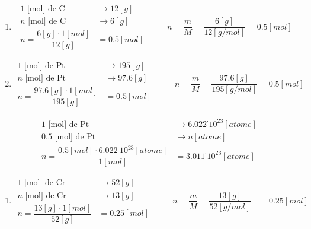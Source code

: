 \documentclass[
  11pt,
  a4paper,
  openany]{book}
\providecommand{\tightlist}{%
  \setlength{\itemsep}{0pt}\setlength{\parskip}{0pt}}
\begin{document}
\begin{Answer}

\begin{enumerate}
\def\labelenumi{\arabic{enumi}.}
\item
  \[ \begin{split}
           1 \text{ [mol] de C } &\longrightarrow 12 [g]\\
           n \text{ [mol] de C } &\longrightarrow 6 [g]\\
           n = \dfrac{6 [g] \cdot 1 [mol]}{12 [g]} &= 0.5 [mol]
       \end{split}
       \qquad
       \begin{split}
       n = \dfrac{m}{M} = \dfrac{6[g]}{12[g/mol]} = 0.5 [mol]
   \end{split} \]
\item
  \[ \begin{split}
           1 \text{ [mol] de Pt } &\longrightarrow 195 [g]\\
           n \text{ [mol] de Pt } &\longrightarrow 97.6 [g]\\
           n = \dfrac{97.6 [g] \cdot 1 [mol]}{195 [g]} &= 0.5 [mol]
       \end{split}
       \qquad
       \begin{split}
       n = \dfrac{m}{M} = \dfrac{97.6[g]}{195[g/mol]} = 0.5 [mol]
   \end{split} \]
\end{enumerate}

\[ \begin{split}
  1 \text{ [mol] de Pt } &\longrightarrow 6.022^\cdot10^{23} [atome]\\
  0.5 \text{ [mol] de Pt } &\longrightarrow n [atome]\\
  n = \dfrac{0.5 [mol] \cdot 6.022^\cdot10^{23} [atome]}{1 [mol]} &= 3.011^\cdot10^{23} [atome]
  \end{split} \]

\begin{enumerate}
\def\labelenumi{\arabic{enumi}.}
\setcounter{enumi}{2}
\tightlist
\item
  \[ \begin{split}
       1 \text{ [mol] de Cr } &\longrightarrow 52 [g]\\
       n \text{ [mol] de Cr } &\longrightarrow 13 [g]\\
       n = \dfrac{13 [g] \cdot 1 [mol]}{52 [g]} &= 0.25 [mol]
       \end{split}
       \qquad
       \begin{split}
       n = \dfrac{m}{M} = \dfrac{13[g]}{52[g/mol]} &= 0.25 [mol]
   \end{split} \]
\end{enumerate}


\end{Answer}
\end{document}
